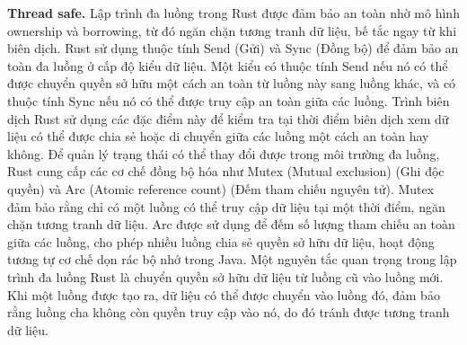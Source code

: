 \textbf{Thread safe.} Lập trình đa luồng trong Rust được đảm bảo an toàn nhờ mô hình ownership và borrowing, từ đó ngăn chặn tương tranh dữ liệu, bế tắc ngay từ khi biên dịch.
Rust sử dụng thuộc tính Send (Gửi) và Sync (Đồng bộ) để đảm bảo an toàn đa luồng ở cấp độ kiểu dữ liệu.
Một kiểu có thuộc tính Send nếu nó có thể được chuyển quyền sở hữu một cách an toàn từ luồng này sang luồng khác, và có thuộc tính Sync nếu nó có thể được truy cập an toàn giữa các luồng.
Trình biên dịch Rust sử dụng các đặc điểm này để kiểm tra tại thời điểm biên dịch xem dữ liệu có thể được chia sẻ hoặc di chuyển giữa các luồng một cách an toàn hay không.
Để quản lý trạng thái có thể thay đổi được trong môi trường đa luồng, Rust cung cấp các cơ chế đồng bộ hóa như Mutex (Mutual exclusion) (Ghi độc quyền) và Arc (Atomic reference count) (Đếm tham chiếu nguyên tử).
Mutex đảm bảo rằng chỉ có một luồng có thể truy cập dữ liệu tại một thời điểm, ngăn chặn tương tranh dữ liệu.
Arc được sử dụng để đếm số lượng tham chiếu an toàn giữa các luồng, cho phép nhiều luồng chia sẻ quyền sở hữu dữ liệu, hoạt động tương tự cơ chế dọn rác bộ nhớ trong Java.
Một nguyên tắc quan trọng trong lập trình đa luồng Rust là chuyển quyền sở hữu dữ liệu từ luồng cũ vào luồng mới.
Khi một luồng được tạo ra, dữ liệu có thể được chuyển vào luồng đó, đảm bảo rằng luồng cha không còn quyền truy cập vào nó, do đó tránh được tương tranh dữ liệu.


